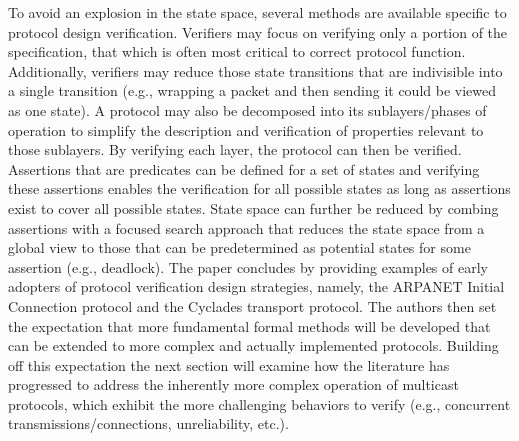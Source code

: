 \documentclass[12pt, fullpage]{article}
\begin{document}
\bigbreak
To avoid an explosion in the state space, several methods are available specific to protocol design verification. Verifiers may focus on verifying only a portion of the specification, that which is often most critical to correct protocol function. Additionally, verifiers may reduce those state transitions that are indivisible into a single transition (e.g., wrapping a packet and then sending it could be viewed as one state). A protocol may also be decomposed into its sublayers/phases of operation to simplify the description and verification of properties relevant to those sublayers. By verifying each layer, the protocol can then be verified. Assertions that are predicates can be defined for a set of states and verifying these assertions enables the verification for all possible states as long as assertions exist to cover all possible states. State space can further be reduced by combing assertions with a focused search approach that reduces the state space from a global view to those that can be predetermined as potential states for some assertion (e.g., deadlock). 
\bigbreak
The paper concludes by providing examples of early adopters of protocol verification design strategies, namely, the ARPANET Initial Connection protocol and the Cyclades transport protocol. The authors then set the expectation that more fundamental formal methods will be developed that can be extended to more complex and actually implemented protocols. Building off this expectation the next section will examine how the literature has progressed to address the inherently more complex operation of multicast protocols, which exhibit the more challenging behaviors to verify (e.g., concurrent transmissions/connections, unreliability, etc.).
\bigbreak
\end{document}
